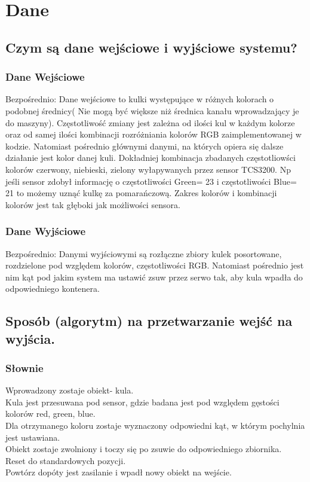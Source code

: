 \documentclass[12pt]{article}
\begin{document}
\section{Dane}
\subsection{Czym są dane wejściowe i wyjściowe systemu?}
\subsubsection{Dane Wejściowe}
Bezpośrednio: Dane wejściowe to kulki występujące w różnych kolorach o podobnej średnicy( Nie mogą być większe niż średnica kanału wprowadzający je do maszyny). Częstotliwość zmiany jest zależna od ilości kul w każdym kolorze oraz od samej ilości kombinacji rozróżniania kolorów RGB zaimplementowanej w kodzie. Natomiast pośrednio głównymi danymi, na których opiera się dalsze działanie jest kolor danej kuli. Dokładniej kombinacja zbadanych częstotliowści kolorów czerwony, niebieski, zielony wyłapywanych przez sensor TCS3200. Np jeśli sensor zdobył informację o częstotliwości Green= 23  i częstotliwości Blue= 21 to możemy uznąć kulkę za pomarańczową. Zakres kolorów i kombinacji kolorów jest tak głęboki jak możliwości sensora.
\subsubsection{Dane Wyjściowe}
Bezpośrednio: Danymi wyjściowymi są rozłączne zbiory kulek posortowane, rozdzielone pod względem kolorów, częstotliwości RGB. Natomiast pośrednio jest nim kąt pod jakim system ma ustawić zsuw przez serwo tak, aby kula wpadła do odpowiedniego kontenera.
\subsection{Sposób (algorytm) na przetwarzanie wejść na wyjścia.}
\subsubsection{Słownie}
Wprowadzony zostaje obiekt- kula.\\
Kula jest przesuwana pod sensor, gdzie badana jest pod względem gęstości kolorów red, green, blue.\\
Dla otrzymanego koloru zostaje wyznaczony odpowiedni kąt, w którym pochylnia jest ustawiana.\\
Obiekt zostaje zwolniony i toczy się po zsuwie do odpowiedniego zbiornika.\\
Reset do standardowych pozycji.\\
Powtórz dopóty jest zasilanie i wpadł nowy obiekt na wejście.\\
\end{document}

